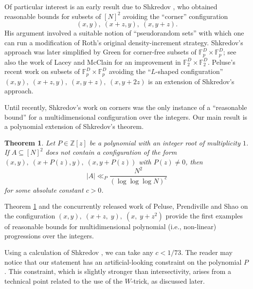 \documentclass[11pt]{amsart}
\newtheorem{theorem}[lemma]{Theorem}
\theoremstyle{definition}
\newcommand{\F}{{\mathbb F}}
\begin{document}
Of particular interest is an early result due to Shkredov \cite{Sh06b, Sh06a}, who obtained reasonable bounds for subsets of $[N]^2$ avoiding the ``corner'' configuration
$$(x,y),\; (x+z,y),\; (x,y+z).$$
His argument involved a suitable notion of ``pseudorandom sets'' with which one can run a modification of Roth's original density-increment strategy.  Shkredov's approach was later simplified by Green \cite{G05b, G05} for corner-free subsets of $\mathbb{F}_p^D \times \mathbb{F}_p^D$; see also the work of Lacey and McClain \cite{LM07} for an improvement in $\mathbb{F}_2^D \times \mathbb{F}_2^D$.  Peluse's recent work on subsets of $\F_p^D\times\F_p^D$ avoiding the ``$L$-shaped configuration'' $(x, y),\; (x + z, y),\; (x, y + z),\; (x, y + 2z)$ is an extension of Shkredov's approach.


Until recently, Shkredov's work on corners was the only instance of a ``reasonable bound'' for a multidimensional configuration over the integers. Our main result is a polynomial extension of Shkredov's theorem.
\begin{theorem}\label{maintheorem}
Let $P \in \mathbb{Z}[z]$ be a polynomial with an integer root of multiplicity $1$. If $A \subseteq [N]^2$ does not contain a configuration of the form $(x, y),\; (x + P(z), y),\; (x, y + P(z))$ with $P(z) \neq 0$, then
$$|A| \ll_P \frac{N^2}{(\log\log\log N)^c}$$
for some absolute constant $c > 0$.
\end{theorem}

Theorem \ref{maintheorem} and the concurrently released work of Peluse, Prendiville and Shao \cite{PPS24} on the configuration $(x, y),\; (x + z,\; y),\; (x,\; y + z^2)$ provide the first examples of reasonable bounds for multidimensional polynomial (i.e., non-linear) progressions over the integers.

Using a calculation of Shkredov \cite{Sh06b}, we can take any $c<1/73$. The reader may notice that our statement has an artificial-looking constraint on the polynomial $P$.  This constraint, which is slightly stronger than intersectivity, arises from a technical point related to the use of the $W$-trick, as discussed later.
\end{document}
